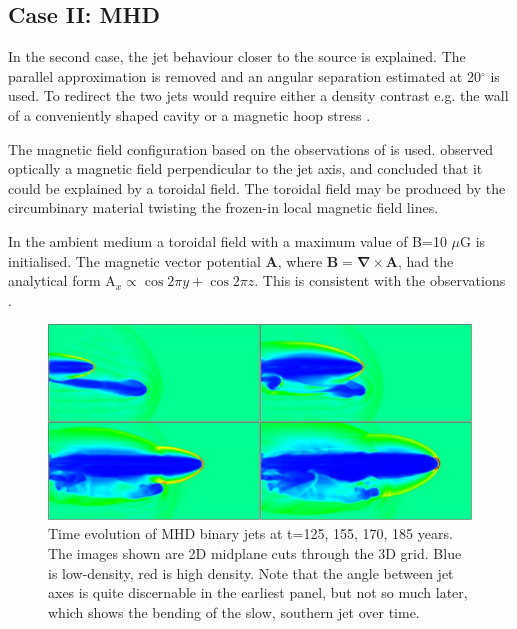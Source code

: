 \subsection{Case II: MHD}
\label{sec:BinJetMHD}

In the second case, the jet behaviour closer to the source is explained.
The parallel approximation is removed and an angular separation estimated 
at 20$^\circ$ is used. To redirect the two jets would require either a density contrast 
e.g. the wall of a conveniently shaped cavity or a magnetic hoop stress
\citep{2003ApJ...584..843B}.

The magnetic field configuration based on the observations 
of \citet{1988MNRAS.231P..39S} is used. \citet{1988MNRAS.231P..39S} observed 
optically a magnetic field perpendicular to the jet axis, and 
concluded that it could be explained by a toroidal field. The toroidal field may be
produced by the circumbinary material twisting the frozen-in local magnetic field lines. 

In the ambient medium a toroidal field with a maximum value of B=10 $\mu$G is initialised. The magnetic
vector potential ${\mathbf A}$, where ${\mathbf B = \boldsymbol{\nabla}} \times {\mathbf A}$,
had the analytical form A$_x \propto \cos 2 \pi  y + \cos 2 \pi  z.$
This is consistent with the observations \citep{1988MNRAS.231P..39S}.

\begin{figure}[t]
\centering
\includegraphics[width=\textwidth]{3d_mhd_twin_jet}
\caption{ 
Time evolution of MHD binary jets at t=125, 155, 170, 185 years. The images shown are
2D midplane cuts through the 3D grid.
Blue is low-density, red is high density.
Note that the angle between jet axes is quite discernable in the earliest panel, but not so much later, which shows the bending of the slow, southern jet over time.
}
\label{fig:4-49}
\end{figure}

